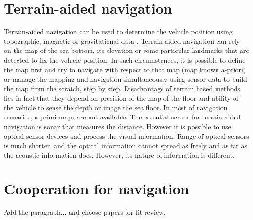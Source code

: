 \section{Terrain-aided navigation} 
Terrain-aided navigation can be used to determine the vehicle position using topographic, magnetic or gravitational data \cite{kinsey06}. Terrain-aided navigation can rely on the map of the sea bottom, its elevation or some particular landmarks that are detected to fix the vehicle position. In such circumstances, it is possible to define the map first and try to navigate with respect to that map (map known a-priori) or manage the mapping and navigation simultaneously using sensor data to build the map from the scratch, step by step. Disadvantage of terrain based methods lies in fact that they depend on precision of the map of the floor and ability of the vehicle to sense the depth or image the sea floor. In most of navigation scenarios, a-priori maps are not available.
The essential sensor for terrain aided navigation is sonar that measures the distance. However it is possible to use optical sensor devices and process the visual information. Range of optical sensors is much shorter, and the optical information cannot spread as freely and as far as the acoustic information does. However, its nature of information is different.
  
\section{Cooperation for navigation}
Add the paragraph... and choose papers for lit-review.

